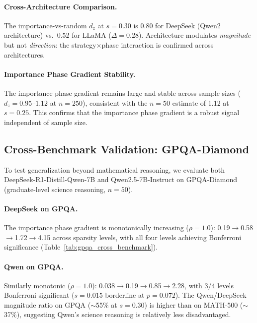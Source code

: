 \documentclass[11pt]{article}
\begin{document}
\paragraph{Cross-Architecture Comparison.}
The importance-vs-random $d_z$ at $s=0.30$ is 0.80 for DeepSeek (Qwen2 architecture) vs.\ 0.52 for LLaMA ($\Delta=0.28$). Architecture modulates \emph{magnitude} but not \emph{direction}: the strategy$\times$phase interaction is confirmed across architectures.

\paragraph{Importance Phase Gradient Stability.}
The importance phase gradient remains large and stable across sample sizes ($d_z=0.95$--$1.12$ at $n=250$), consistent with the $n=50$ estimate of 1.12 at $s=0.25$. This confirms that the importance phase gradient is a robust signal independent of sample size.

\subsection{Cross-Benchmark Validation: GPQA-Diamond}
\label{sec:gpqa}

To test generalization beyond mathematical reasoning, we evaluate both DeepSeek-R1-Distill-Qwen-7B and Qwen2.5-7B-Instruct on GPQA-Diamond (graduate-level science reasoning, $n=50$).

\paragraph{DeepSeek on GPQA.}
The importance phase gradient is monotonically increasing ($\rho=1.0$): 0.19$\to$0.58$\to$1.72$\to$4.15 across sparsity levels, with all four levels achieving Bonferroni significance (Table~\ref{tab:gpqa_cross_benchmark}).

\paragraph{Qwen on GPQA.}
Similarly monotonic ($\rho=1.0$): 0.038$\to$0.19$\to$0.85$\to$2.28, with 3/4 levels Bonferroni significant ($s=0.015$ borderline at $p=0.072$). The Qwen/DeepSeek magnitude ratio on GPQA ($\sim$55\% at $s=0.30$) is higher than on MATH-500 ($\sim$37\%), suggesting Qwen's science reasoning is relatively less disadvantaged.
\end{document}
